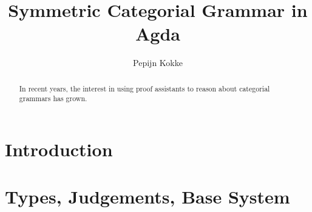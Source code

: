 \documentclass[twocolumn]{article}
\begin{document}
\title{Symmetric Categorial Grammar in Agda}%
\author{Pepijn Kokke}%
\maketitle

\begin{abstract}
In recent years, the interest in using proof assistants to reason about
categorial grammars has grown.
\end{abstract}


\section{Introduction}


\section{Types, Judgements, Base System}
\end{document}
